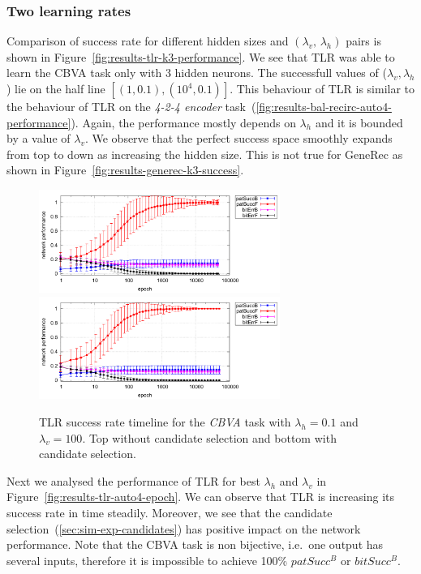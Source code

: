 \subsubsection{Two learning rates} 
\label{sec:tlr-k3}

Comparison of success rate for different hidden sizes and $(\lambda_v,\,\lambda_h)$ pairs is shown in Figure~\ref{fig:results-tlr-k3-performance}. We see that TLR was able to learn the CBVA task only with 3 hidden neurons. The successfull values of ($\lambda_v, \lambda_h$) lie on the half line $[(1, 0.1), (10^4, 0.1)]$. This behaviour of TLR is similar to the behaviour of TLR on the \emph{4-2-4 encoder} task~(\ref{fig:results-bal-recirc-auto4-performance}). Again, the performance mostly depends on $\lambda_h$ and it is bounded by a value of $\lambda_v$. We observe that the perfect success space smoothly expands from top to down as increasing the hidden size. This is not true for GeneRec as shown in Figure~\ref{fig:results-generec-k3-success}. 

\begin{figure}[H]
  \centering
  \includegraphics[width=0.7\textwidth]{img/tlr-k3-3-best-perf.pdf}   
  \includegraphics[width=0.7\textwidth]{img/tlr-k3-3-best-can.pdf}      
  \caption{TLR success rate timeline for the \emph{CBVA} task with $\lambda_h=0.1$ and $\lambda_v=100$. Top without candidate selection and bottom with candidate selection. }
  \label{fig:results-tlr-k3-epoch} 
\end{figure}

Next we analysed the performance of TLR for best $\lambda_h$ and $\lambda_v$ in Figure~\ref{fig:results-tlr-auto4-epoch}. We can observe that TLR is increasing its success rate in time steadily. Moreover, we see that the candidate selection~(\ref{sec:sim-exp-candidates}) has positive impact on the network performance.
Note that the CBVA task is non bijective, i.e.~one output has several inputs, therefore it is impossible to achieve 100\% $patSucc^B$ or $bitSucc^B$. 

